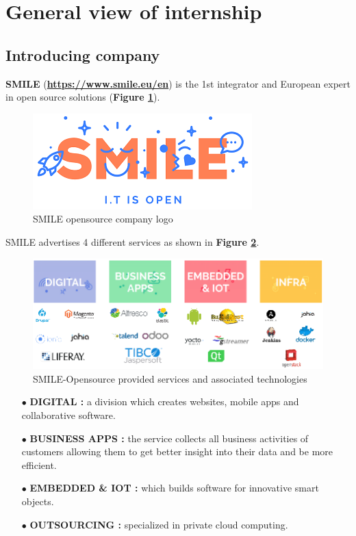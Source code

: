 \section{General view of internship}

\subsection{Introducing company}
\textbf{SMILE} (\textbf{\color{blue}\url{https://www.smile.eu/en}}) is the 1st integrator and European expert in open source solutions (\textbf{Figure \ref{SMILE opensource company}}). 

			\begin{figure}[H]
					\centering
        			\includegraphics[scale=0.55]{img/smile.png}
        			\caption{SMILE opensource company logo}
        			\label{SMILE opensource company}
   			 \end{figure}

SMILE advertises 4 different services as shown in \textbf{Figure \ref{SMILE opensource services and associated opensource technologies}}.
			\begin{figure}[H]
					\centering
        			\includegraphics[scale=0.55]{img/smile-services-technologies.png}
        			\caption{SMILE-Opensource provided services and associated technologies}
        			\label{SMILE opensource services and associated opensource technologies}
   			 \end{figure}


\begin{itemize}
	\item[$\bullet$] \textbf{DIGITAL : } a division which creates websites, mobile apps and collaborative software. 
	\item[$\bullet$] \textbf{BUSINESS APPS : } the service collects all business activities of customers allowing them to get better insight into their data and be more efficient. 
	\item[$\bullet$] \textbf{EMBEDDED \& IOT : } which builds software for innovative smart objects.
	\item[$\bullet$] \textbf{OUTSOURCING : } specialized in private cloud computing. 
\end{itemize}


